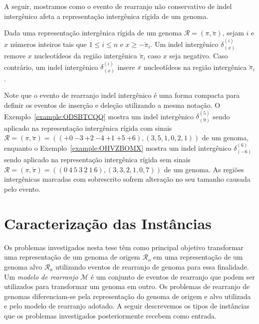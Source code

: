 \pagebreak



A seguir, mostramos como o evento de rearranjo não conservativo de indel intergênico afeta a representação intergênica rígida de um genoma.

\begin{definition}
Dada uma representação intergênica rígida de um genoma $\mathcal{R} = (\pi,\breve\pi)$, sejam $i$ e $x$ números inteiros tais que $1 \le i \le n$ e $x \ge -\breve\pi_i$. Um indel intergênico $\delta^{(i)}_{(x)}$ remove $x$ nucleotídeos da região intergênica $\breve\pi_i$ caso $x$ seja negativo. Caso contrário, um indel intergênico $\delta^{(i)}_{(x)}$ insere $x$ nucleotídeos na região intergênica $\breve\pi_i$.
\end{definition}

Note que o evento de rearranjo indel intergênico é uma forma compacta para definir os eventos de inserção e deleção utilizando a mesma notação. O Exemplo~\ref{example:ODSBTCQQ} mostra um indel intergênico $\delta^{(5)}_{(9)}$ sendo aplicado na representação intergênica rígida com sinais $\mathcal{R} = (\pi,\breve\pi) = \allowbreak(({+0}~{-3}~{+2}~{-4}~{+1}~{+5}~{+6}),\allowbreak(3,5,1,0,2,1))$ de um genoma, enquanto o Exemplo~\ref{example:OHVZBOMX} mostra um indel intergênico $\delta^{(6)}_{(-6)}$ sendo aplicado na representação intergênica rígida sem sinais $\mathcal{R} = (\pi,\breve\pi) = \allowbreak(({0}~{4}~{5}~{3}~{2}~{1}~{6}),\allowbreak(3,3,2,1,0,7))$ de um genoma. As regiões intergênicas marcadas com sobrescrito sofrem alteração no seu tamanho causada pelo evento.





\section{Caracterização das Instâncias}

Os problemas investigados nesta tese têm como principal objetivo transformar uma representação de um genoma de origem $\mathcal{R}_{o}$ em uma representação de um genoma alvo $\mathcal{R}_{a}$ utilizando eventos de rearranjo de genoma para essa finalidade. Um \emph{modelo de rearranjo} $\mathcal{M}$ é um conjunto de eventos de rearranjo que podem ser utilizados para transformar um genoma em outro. Os problemas de rearranjo de genomas diferenciam-se pela representação do genoma de origem e alvo utilizada e pelo modelo de rearranjo adotado. A seguir descrevemos os tipos de instâncias que os problemas investigados posteriormente recebem como entrada. 

